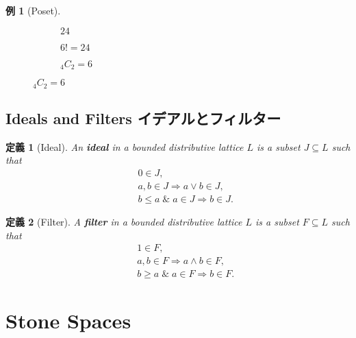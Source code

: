 \documentclass[a4j,12pt]{jarticle}
\numberwithin{equation}{section}
\newtheorem{example}{例}[section]
\newcommand{\itbf}[1]{\textit{\textbf{#1}}}
\newtheorem{dfn}{定義}[section]
\begin{document}
\begin{example}[Poset]
\begin{figure}[H]
\begin{subfigure}{0.1\textwidth}
\begin{tikzpicture}[scale=.7]
      \end{tikzpicture}
      \caption*{$24$}
    \end{subfigure}
    \begin{subfigure}{0.1\textwidth}
      \caption*{$6!=24$}
    \end{subfigure}
    \begin{subfigure}{0.1\textwidth}
      \caption*{${}_4C_2=6$}
    \end{subfigure}
  \end{figure}  
\end{example}
\subsection{Ideals and Filters イデアルとフィルター}
\begin{dfn}[Ideal]
  An \itbf{ideal} in a bounded distributive lattice $L$ is a subset $J \subseteq L$ such that
  \begin{eqnarray}
    \label{eq:ideal}
    && 0 \in J,\\
    && a,b \in J \Rightarrow a \vee b \in J,\\
    && b\le a \;\&\; a \in J \Rightarrow b \in J.
  \end{eqnarray}
\end{dfn}
\begin{dfn}[Filter]
  A \itbf{filter} in a bounded distributive lattice $L$ is a subset $F \subseteq L$ such that
  \begin{eqnarray}
    \label{eq:filter}
    && 1 \in F,\\
    && a,b \in F \Rightarrow a \wedge b \in F,\\
    && b \ge a \;\&\; a \in F \Rightarrow b \in F.
  \end{eqnarray}
\end{dfn}
\section{Stone Spaces}
\end{document}
